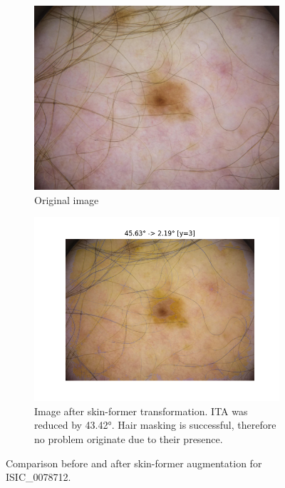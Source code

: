 \begin{figure}[ht]
    \centering
    \begin{subfigure}[b]{0.45\textwidth}
        \includegraphics[width=\linewidth]{figures/skin_former/ISIC_0078712.jpg}
        \caption{Original image}
        \label{fig:original_0078712}
    \end{subfigure}
    \hfill
    \begin{subfigure}[b]{0.45\textwidth}
        \includegraphics[width=\linewidth]{figures/skin_former/ISIC_0078712.jpg_shifted.png}
        \caption{Image after skin-former transformation. ITA was reduced by 43.42°. Hair masking is successful, therefore no problem originate due to their presence.}
        \label{fig:shifted_0078712}
    \end{subfigure}
    \caption{Comparison before and after skin-former augmentation for ISIC\_0078712.}
    \label{fig:skinformer_0078712}
\end{figure}
